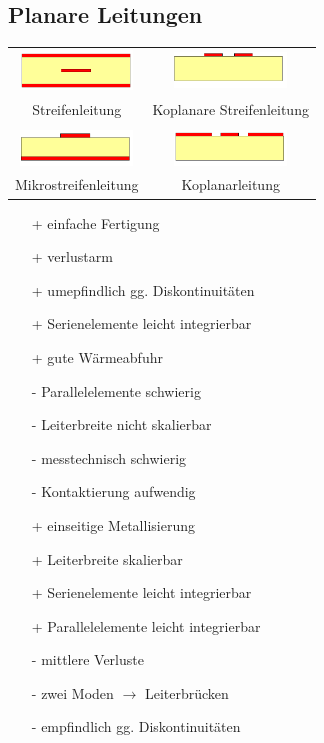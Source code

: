\documentclass[english]{latex4ei/latex4ei_sheet}
\begin{document}
\begin{sectionbox}
	\subsection{Planare Leitungen}
	\begin{tabular*}{\columnwidth}{cc}
		\includegraphics[width = 3cm]{./img/streifenleitung.png} & \includegraphics[width = 3cm]{./img/koplanar_streifen_leitung.png}\\
		Streifenleitung & Koplanare Streifenleitung\\
		\hline\\
		\includegraphics[width = 3cm]{./img/mikrostreifen_leitung.png} & \includegraphics[width = 3cm]{./img/koplanar_leitung.png}\\
		Mikrostreifenleitung & Koplanarleitung\\
	\end{tabular*}
	\vspace{-6mm}
	\begin{multicols*}{2}
	\begin{itemize}
		\item[+] einfache Fertigung
		\item[+] verlustarm
		\item[+] umepfindlich gg. Diskontinuitäten
		\item[+] Serienelemente leicht integrierbar
		\item[+] gute Wärmeabfuhr 
		\item[-] Parallelelemente schwierig
		\item[-] Leiterbreite nicht skalierbar
		\item[-] messtechnisch schwierig
		\item[-] Kontaktierung aufwendig
	\end{itemize}
	\columnbreak
	\begin{itemize}
		\item[+] einseitige Metallisierung
		\item[+] Leiterbreite skalierbar
		\item[+] Serienelemente leicht integrierbar
		\item[+] Parallelelemente leicht integrierbar
		\item[-] mittlere Verluste
		\item[-] zwei Moden $\rightarrow$ Leiterbrücken 
		\item[-] empfindlich gg. Diskontinuitäten 
	\end{itemize}
\end{multicols*}


\end{sectionbox}
\end{document}
